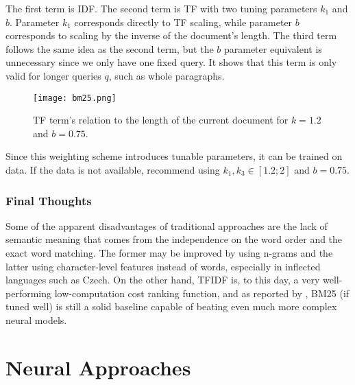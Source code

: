 The first term is IDF.
The second term is TF with two tuning parameters $k_1$ and $b$. Parameter $k_1$ corresponds directly to TF scaling, while parameter $b$ corresponds to scaling by the inverse of the document's length.
The third term follows the same idea as the second term, but the $b$ parameter equivalent is unnecessary since we only have one fixed query.
It shows \citep{schutze2008introduction} that this term is only valid for longer queries $q$, such as whole paragraphs. 
\begin{figure}[h!]
    \centering
    \texttt{[image: bm25.png]}
    \caption{TF term's relation to the length of the current document for $k=1.2$ and $b=0.75$.}
\end{figure}

Since this weighting scheme introduces tunable parameters, it can be trained on data. If the data is not available, \citet[Section 11.4.3]{schutze2008introduction} recommend using $k_1, k_3 \in [1.2;2]$ and $b=0.75$.


\subsubsection{Final Thoughts}

Some of the apparent disadvantages of traditional approaches are the lack of semantic meaning that comes from the independence on the word order and the exact word matching. %
The former may be improved by using n-grams and the latter using character-level features instead of words, especially in inflected languages such as Czech.
On the other hand, TFIDF is, to this day, a very well-performing low-computation cost ranking function, and as reported by \cite{weak-baselines}, BM25 (if tuned well) is still a solid baseline capable of beating even much more complex neural models.

\section{Neural Approaches}

